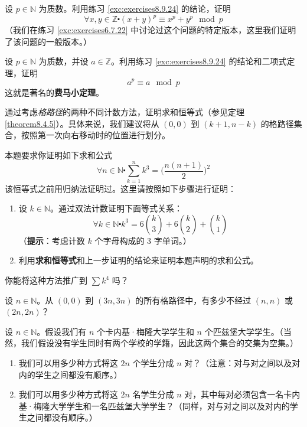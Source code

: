 \begin{exercise}
    设 $p \in \mathbb{N}$ 为质数。利用练习 \ref{exc:exercises8.9.24} 的结论，证明
    \[\forall x, y \in \mathbb{Z} \centerdot (x + y)^p \equiv x^p + y^p \mod p\]
    （我们在练习 \ref{exc:exercises6.7.22} 中讨论过这个问题的特定版本，这里我们证明了该问题的一般版本。）
\end{exercise}

\begin{exercise}
    设 $p \in \mathbb{N}$ 为质数，并设 $a \in \mathbb{Z}$。利用练习 \ref{exc:exercises8.9.24} 的结论和二项式定理，证明
    \[a^p \equiv a \mod p\]
    这就是著名的\textbf{费马小定理}。
\end{exercise}

\begin{exercise}
    通过考虑\emph{格路径}的两种不同计数方法，证明求和恒等式（参见定理 \ref{theorem8.4.5}）。具体来说，我们建议将从 $(0, 0)$ 到 $(k + 1, n - k)$ 的格路径集合，按照第一次向右移动时的位置进行划分。
\end{exercise}

\begin{exercise}
    本题要求你证明如下求和公式
    \[\forall n \in \mathbb{N} \centerdot \sum_{k=1}^{n}k^3 = \Big(\frac{n(n+1)}{2}\Big)^2\]
    该恒等式之前用归纳法证明过。这里请按照如下步骤进行证明：
    \begin{enumerate}[label=(\alph*)]
        \item 设 $k \in \mathbb{N}$。通过双法计数证明下面等式关系：
              \[\forall k \in \mathbb{N} \centerdot k^3 = 6{k \choose 3}+6{k \choose 2}+{k \choose 1}\]
              （\textbf{提示}：考虑计数 $k$ 个字母构成的 $3$ 字单词。）
        \item 利用\textbf{求和恒等式}和上一步证明的结论来证明本题声明的求和公式。
    \end{enumerate}
    你能将这种方法推广到 $\sum k^4$ 吗？
\end{exercise}

\begin{exercise}
    设 $n \in \mathbb{N}$。从 $(0,0)$ 到 $(3n,3n)$ 的所有格路径中，有多少不经过 $(n,n)$ 或 $(2n,2n)$？
\end{exercise}

\begin{exercise}
    设 $n \in \mathbb{N}$。假设我们有 $n$ 个卡内基·梅隆大学学生和 $n$ 个匹兹堡大学学生。（当然，我们假设没有学生同时有两个学校的学籍，因此这两个集合的交集为空集。）
    \begin{enumerate}[label=(\alph*)]
        \item 我们可以用多少种方式将这 $2n$ 个学生分成 $n$ 对？（注意：对与对之间以及对内的学生之间都没有顺序。）
        \item 我们可以用多少种方式将这 $2n$ 名学生分成 $n$ 对，其中每对必须包含一名卡内基·梅隆大学学生和一名匹兹堡大学学生？（同样，对与对之间以及对内的学生之间都没有顺序。）
    \end{enumerate}
\end{exercise}

